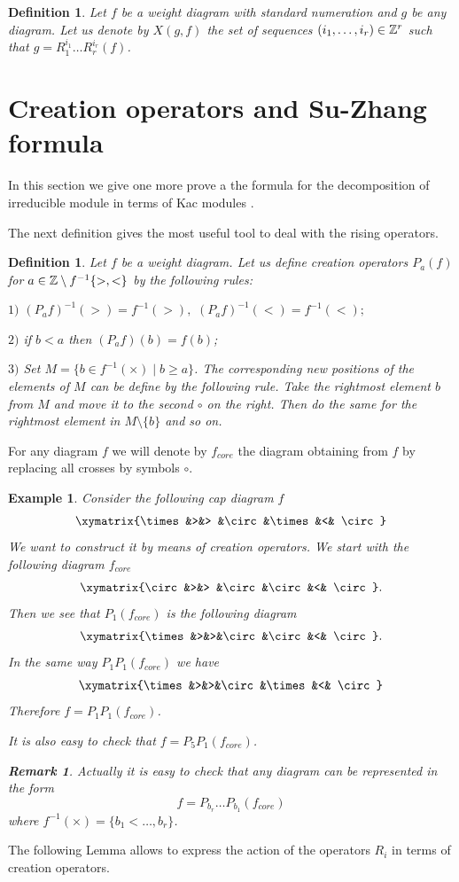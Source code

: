 \documentclass[12pt,reqno]{amsart}
\newtheorem{definition}[thm]{Definition}
\newtheorem{example}[thm]{Example}
\newtheorem{remark}[thm]{Remark}
\begin{document}
\begin{definition} Let $f$ be a weight diagram with standard numeration and $g$ be any diagram. Let us denote  by $X(g,f)$  the set of sequences $(i_1,\dots,i_r)\in\Bbb Z^r$ such that $g=R_1^{i_1}\dots R_r^{i_r}(f)$.
\end{definition}

\section{Creation operators and Su-Zhang formula}
In this section we give one more prove a the formula  for the decomposition of irreducible   module in terms of Kac modules \cite{SZ,Ser2}.

The next definition gives the most useful tool to deal with  the rising operators. 

\begin{definition}\label{create} Let $f$ be a  weight diagram.   Let us define  creation operators $P_a(f)$ for $a\in \Bbb Z\setminus f^{-1}\{>,<\}$ by the following rules:

$1)$ $ (P_a f)^{-1}(>)=f^{-1}(>),\,\, ( P_a f)^{-1}(<)=f^{-1}(<);\,\,$

$2)$ if $b< a$ then $ (P_af)(b)=f(b)$;

$3)$  Set $M=\{b\in f^{-1}(\times)\mid b\ge a\}$. The corresponding new positions  of the elements of $M$ can be define by the following rule. Take the rightmost  element  $b$ from $M$ and   move it to  the second  $\circ $ on the right.  Then do  the same for the  rightmost  element in   $M\setminus\{b\}$ and  so on. 
\end{definition}

For any diagram $f$ we will denote by $f_{core}$  the diagram obtaining from $f$ by replacing all crosses by symbols $\circ$.












\begin{example}
Consider the following  cap diagram $f$
$$
\xymatrix{\times&>&> &\circ &\times &<& \circ}
$$
We want to construct it by means of creation operators.
We start with the following diagram $f_{core}$
$$
\xymatrix{\circ&>&> &\circ &\circ &<& \circ}.
$$
Then we  see that $P_1(f_{core})$ is the following diagram
$$
\xymatrix{\times &>&>&\circ &\circ &<& \circ}. 
$$
 In the same way   $P_1P_1(f_{core})$ we have 
$$
\xymatrix{\times&>&>&\circ &\times &<& \circ}
$$
Therefore  $f=P_1P_1(f_{core})$.


It is  also easy to check  that  $f=P_5 P_1(f_{core})$. 
\begin{remark} 

Actually it is easy to check that  any diagram can be represented in the form
$$
f=P_{b_r}\dots P_{b_1}(f_{core})
$$
where $f^{-1}(\times)=\{b_1<\dots,b_r\}$.
\end{remark}
\end{example}
The following Lemma allows to express the action of the operators  $R_i$ in terms of creation operators.  
\end{document}
